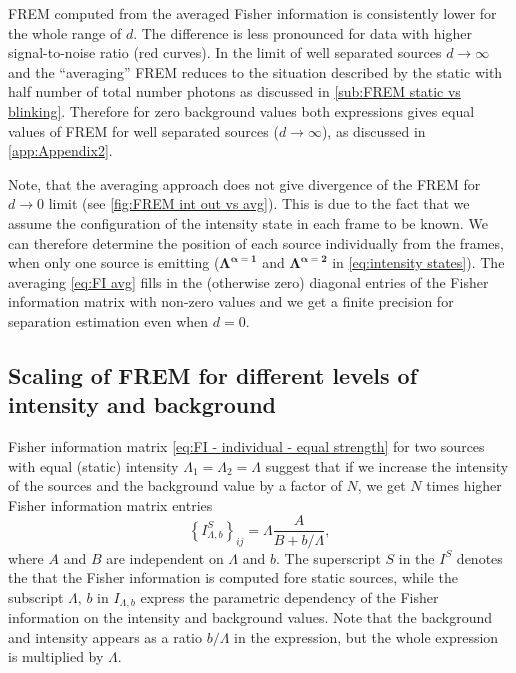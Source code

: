 FREM computed from the averaged Fisher information is consistently lower for the whole range of $d$. The difference is less pronounced for data with higher signal-to-noise ratio (red curves). In the limit of well separated sources $d\rightarrow\infty$ and the ``averaging'' FREM reduces to the situation described by the static with half number of total number photons as discussed in \autoref{sub:FREM static vs blinking}. Therefore for zero background values both expressions gives equal values of FREM for well separated sources ($d\rightarrow\infty$), as discussed in \autoref{app:Appendix2}.

Note, that the averaging approach does not give divergence of the FREM for $d\rightarrow 0$ limit (see \autoref{fig:FREM int out vs avg}\aaa). This is due to the fact that we assume the configuration of the intensity state in each frame to be known. We can therefore determine the position of each source individually from the frames, when only one source is emitting ($\bm{\Lambda^{\alpha=1}}$ and $\bm{\Lambda^{\alpha=2}}$ in \autoref{eq:intensity states}). The averaging \autoref{eq:FI avg} fills in the (otherwise zero) diagonal entries of the Fisher information matrix with non-zero values and we get a finite precision for separation estimation even when $d=0$.


\subsection{Scaling of FREM for different levels of intensity and background\label{sub:scaling}}

Fisher information matrix \autoref{eq:FI - individual - equal strength} for two sources with equal (static) intensity $\Lambda_1=\Lambda_2=\Lambda$ suggest that if we increase the intensity of the sources and the background value by a factor of $N$, we get $N$ times higher Fisher information matrix entries
%
\begin{equation}
	\left\{I_{\Lambda,b}^{S}\right\}_{ij}=\Lambda\frac{A}{B+b/\Lambda},
	\label{eq:FI static on lambda b}
\end{equation}
%
where $A$ and $B$ are independent on $\Lambda$ and $b$. The superscript $S$ in the $I^S$ denotes the that the Fisher information is computed fore static sources, while the subscript $\Lambda,\,b$ in $I_{\Lambda,b}$ express the parametric dependency of the Fisher information on the intensity and background values.  Note that the background and intensity appears as a ratio $b/\Lambda$ in the expression, but the whole expression is multiplied by $\Lambda$. 

